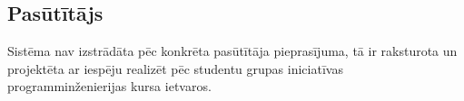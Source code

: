 \subsection{Pasūtītājs}
Sistēma nav izstrādāta pēc konkrēta pasūtītāja pieprasījuma, tā ir raksturota un projektēta ar iespēju realizēt pēc studentu grupas iniciatīvas programminženierijas kursa ietvaros.
